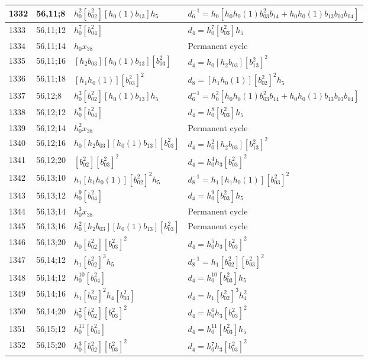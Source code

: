\documentclass{article}
\begin{document}
\begin{longtable}{|l|l|>{\raggedright\arraybackslash}p{6cm}|>{\raggedright\arraybackslash}p{6cm}|}
\hline
1332 & 56,11;8 & $h_0^2[b_{02}^2][h_0(1)b_{13}]h_5$ & $d_{6}^{-1}=h_0[h_0h_0(1)b_{03}^2b_{14} + h_0h_0(1)b_{13}b_{03}b_{04}]$\\
\hline
1333 & 56,11;12 & $h_0^7[b_{04}^2]$ &$d_{4}=h_0^7[b_{03}^2]h_5$\\
\hline
1334 & 56,11;14 & $h_0x_{38}$ & Permanent cycle\\
\hline
1335 & 56,11;16 & $[h_2b_{03}][h_0(1)b_{13}][b_{03}^2]$ &$d_{4}=h_0[h_2b_{03}][b_{13}^2]^2$\\
\hline
1336 & 56,11;18 & $[h_1h_0(1)][b_{03}^2]^2$ &$d_{8}=[h_1h_0(1)][b_{02}^2]^2h_5$\\
\hline
1337 & 56,12;8 & $h_0^3[b_{02}^2][h_0(1)b_{13}]h_5$ & $d_{6}^{-1}=h_0^2[h_0h_0(1)b_{03}^2b_{14} + h_0h_0(1)b_{13}b_{03}b_{04}]$\\
\hline
1338 & 56,12;12 & $h_0^8[b_{04}^2]$ &$d_{4}=h_0^8[b_{03}^2]h_5$\\
\hline
1339 & 56,12;14 & $h_0^2x_{38}$ & Permanent cycle\\
\hline
1340 & 56,12;16 & $h_0[h_2b_{03}][h_0(1)b_{13}][b_{03}^2]$ &$d_{4}=h_0^2[h_2b_{03}][b_{13}^2]^2$\\
\hline
1341 & 56,12;20 & $[b_{02}^2][b_{03}^2]^2$ &$d_{4}=h_0^4h_3[b_{03}^2]^2$\\
\hline
1342 & 56,13;10 & $h_1[h_1h_0(1)][b_{02}^2]^2h_5$ & $d_{8}^{-1}=h_1[h_1h_0(1)][b_{03}^2]^2$\\
\hline
1343 & 56,13;12 & $h_0^9[b_{04}^2]$ &$d_{4}=h_0^9[b_{03}^2]h_5$\\
\hline
1344 & 56,13;14 & $h_0^3x_{38}$ & Permanent cycle\\
\hline
1345 & 56,13;16 & $h_0^2[h_2b_{03}][h_0(1)b_{13}][b_{03}^2]$ & Permanent cycle\\
\hline
1346 & 56,13;20 & $h_0[b_{02}^2][b_{03}^2]^2$ &$d_{4}=h_0^5h_3[b_{03}^2]^2$\\
\hline
1347 & 56,14;12 & $h_1[b_{02}^2]^3h_5$ & $d_{8}^{-1}=h_1[b_{02}^2][b_{03}^2]^2$\\
1348 & 56,14;12 & $h_0^{10}[b_{04}^2]$ &$d_{4}=h_0^{10}[b_{03}^2]h_5$\\
\hline
1349 & 56,14;16 & $h_1[b_{02}^2]^2h_4[b_{03}^2]$ &$d_{4}=h_1[b_{02}^2]^3h_4^2$\\
\hline
1350 & 56,14;20 & $h_0^2[b_{02}^2][b_{03}^2]^2$ &$d_{4}=h_0^6h_3[b_{03}^2]^2$\\
\hline
1351 & 56,15;12 & $h_0^{11}[b_{04}^2]$ &$d_{4}=h_0^{11}[b_{03}^2]h_5$\\
\hline
1352 & 56,15;20 & $h_0^3[b_{02}^2][b_{03}^2]^2$ &$d_{4}=h_0^7h_3[b_{03}^2]^2$\\

\end{longtable}
\end{document}
